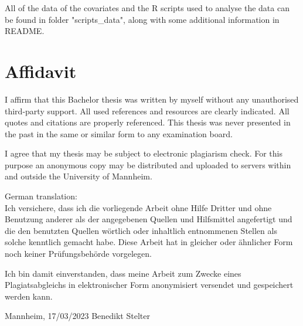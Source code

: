 \documentclass{scrbook}
\begin{document}
\noindent All of the data of the covariates and the R scripts used to analyse the data can be found in folder "scripts\_data", along with some additional information in README.



\chapter{Affidavit}
\thispagestyle{empty}

I affirm that this Bachelor thesis was written by myself without any unauthorised third-party support. All used references and resources are clearly indicated. All quotes and citations are properly referenced. This thesis was never presented in the past in the same or similar form to any examination board. 

\noindent I agree that my thesis may be subject to electronic plagiarism check. For this purpose an anonymous copy may be distributed and uploaded to
servers within and outside the University of Mannheim.

\vspace{2\baselineskip}

\noindent German translation:\\
Ich versichere, dass ich die vorliegende Arbeit ohne Hilfe Dritter und ohne Benutzung anderer
als der angegebenen Quellen und Hilfsmittel angefertigt und die den benutzten Quellen
wörtlich oder inhaltlich entnommenen Stellen als solche kenntlich gemacht habe. Diese Arbeit
hat in gleicher oder ähnlicher Form noch keiner Prüfungsbehörde vorgelegen.

\noindent Ich bin damit einverstanden, dass meine Arbeit zum Zwecke eines Plagiatsabgleichs in
elektronischer Form anonymisiert versendet und gespeichert werden kann.

\vspace{4\baselineskip}
\begin{center}
\parbox{.8\textwidth}{Mannheim, 17/03/2023 \hfill Benedikt Stelter}
\end{center}


 
\end{document}

